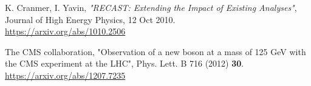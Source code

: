 \begin{thebibliography}{9}
K. Cranmer, I. Yavin, \textit{"RECAST: Extending the Impact of Existing Analyses"}, Journal of High Energy Physics, 12 Oct 2010.\\
\url{https://arxiv.org/abs/1010.2506}


The CMS collaboration, "Observation of a new boson at a mass of 125 GeV with the CMS experiment at the LHC", Phys. Lett. B 716 (2012) \textbf{30}.\\
\url{https://arxiv.org/abs/1207.7235}

\end{thebibliography}
